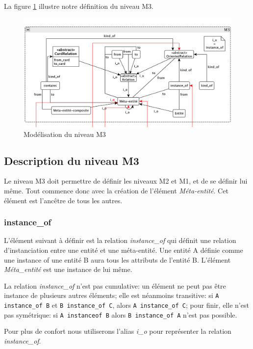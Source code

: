 \documentclass[french,a4paper,titlepage]{article}
\begin{document}
		La figure \ref{fig:M3} illustre notre définition du niveau M3.
		
		\begin{figure}[htb]
			\centering
			\includegraphics[width=\textwidth]{m3.png}
			\caption{Modélisation du niveau M3}
			\label{fig:M3}
		\end{figure}
		
		\subsection{Description du niveau M3}
		
		
			Le niveau M3 doit permettre de définir les niveaux M2 et M1, et de se
			définir lui même. Tout commence donc avec la création de l'élément
			\emph{Méta-entité}. Cet élément est l'ancêtre de tous les autres.
			
			\subsubsection{instance\_of}
			
				L'élément suivant à définir est la relation \emph{instance\_of} qui
				définit une relation d'instanciation entre une entité et une
				méta-entité. Une entité A définie comme une instance of une entité B
				aura tous les attributs de l'entité B. L'élément \emph{Méta\_entité} est
				une instance de lui même.
				
				La relation \emph{instance\_of} n'est pas cumulative: un élément ne peut
				pas être instance de plusieurs autres éléments; elle est néanmoins
				transitive: si \verb!A instance_of B! et \verb!B instance_of C!, alors
				\verb!A instance_of C!; pour finir, elle n'est pas symétrique: si
				\verb!A instanceof B! alors \verb!B instance_of A! n'est pas possible.
				
				Pour plus de confort nous utiliserons l'alias \emph{i\_o} pour
				représenter la relation \emph{instance\_of}.
				
\end{document}
